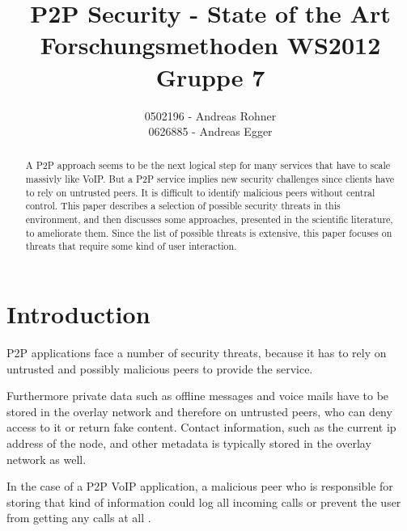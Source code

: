 \documentclass[a4paper,10pt]{article}
\title{P2P Security - State of the Art\\
Forschungsmethoden WS2012\\
Gruppe 7}
\author{0502196 - Andreas Rohner\\
0626885 - Andreas Egger
}
\begin{document}
\maketitle

\begin{abstract}
A P2P approach seems to be the next logical step for many services that have to
scale massivly like VoIP. But a P2P service implies new security challenges
since clients have to rely on untrusted peers. It is difficult to identify
malicious peers without central control. This paper describes a selection of
possible security threats in this
environment, and then discusses some approaches, presented in the scientific
literature, to ameliorate them. Since the list of possible threats is extensive,
this paper focuses on threats that require some kind of user interaction.
\end{abstract}

\section{Introduction}

P2P applications face a number of security threats, because it has
to rely on untrusted and possibly malicious peers to provide the service.

Furthermore private data such as offline messages and voice mails have to be
stored in the overlay network and therefore on untrusted peers, who can
deny access to it or return fake content. Contact information, such as the
current ip address of the node, and other metadata is typically stored in the
overlay network as well.

In the case of a P2P VoIP application, a malicious peer who is
responsible for storing that kind of information could log all incoming calls or
prevent the user from getting any calls at all
\cite{touceda}.

\end{document}
